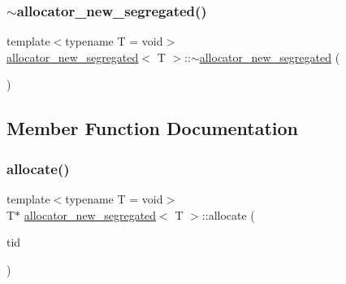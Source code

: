 \mbox{\label{classallocator__new__segregated_aed2e73950c9ee0ef9d349c74fd30ecf8}} 
\subsubsection{\texorpdfstring{$\sim$allocator\+\_\+new\+\_\+segregated()}{~allocator\_new\_segregated()}}
{\footnotesize\ttfamily template$<$typename T  = void$>$ \\
\hyperlink{classallocator__new__segregated}{allocator\+\_\+new\+\_\+segregated}$<$ T $>$\+::$\sim$\hyperlink{classallocator__new__segregated}{allocator\+\_\+new\+\_\+segregated} (\begin{DoxyParamCaption}{ }\end{DoxyParamCaption})\hspace{0.3cm}{\ttfamily [inline]}}



\subsection{Member Function Documentation}
\mbox{\label{classallocator__new__segregated_a5259d0e0d4777b6b4379a611bf6f90b1}} 
\subsubsection{\texorpdfstring{allocate()}{allocate()}}
{\footnotesize\ttfamily template$<$typename T  = void$>$ \\
T$\ast$ \hyperlink{classallocator__new__segregated}{allocator\+\_\+new\+\_\+segregated}$<$ T $>$\+::allocate (\begin{DoxyParamCaption}\item[{const int}]{tid }\end{DoxyParamCaption})\hspace{0.3cm}{\ttfamily [inline]}}

